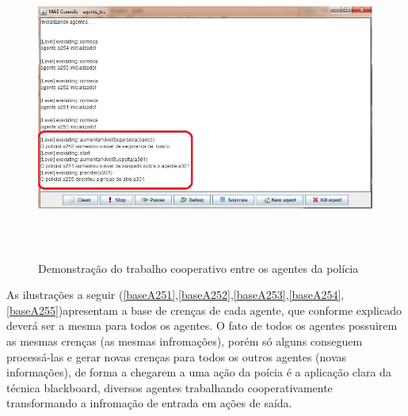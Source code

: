 \begin{figure}
\centering
\includegraphics [height=10cm]{figuras/blackboard.jpg}
\caption{Demonstração do trabalho cooperativo entre os agentes da polícia}
\label{blackB}
\end{figure}

As ilustrações a seguir (\ref{baseA251},\ref{baseA252},\ref{baseA253},\ref{baseA254},\ref{baseA255})apresentam a base de crenças de cada agente, que conforme explicado deverá ser a mesma para todos os agentes. O fato de todos os agentes possuirem as mesmas crenças (as mesmas infromações), porém só alguns conseguem processá-las e gerar novas crenças para todos os outros agentes (novas informações), de forma a chegarem a uma ação da poícia é a aplicação clara da técnica blackboard, diversos agentes trabalhando cooperativamente transformando a infromação de entrada em ações de saída.

